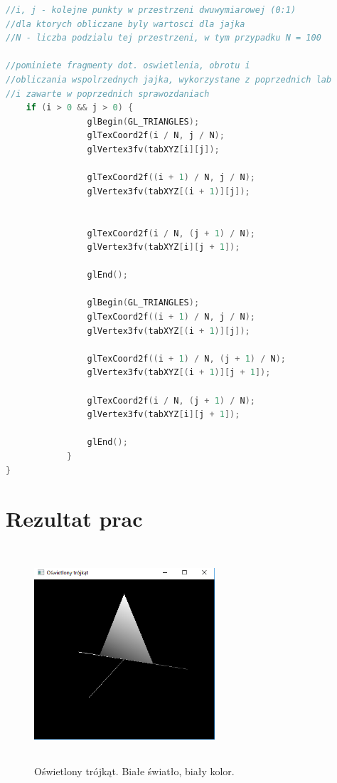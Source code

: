 \documentclass[polish,polish,a4paper]{article}
\begin{document}
{\small
\begin{lstlisting}[language=C++]
//i, j - kolejne punkty w przestrzeni dwuwymiarowej (0:1) 
//dla ktorych obliczane byly wartosci dla jajka
//N - liczba podzialu tej przestrzeni, w tym przypadku N = 100

//pominiete fragmenty dot. oswietlenia, obrotu i 
//obliczania wspolrzednych jajka, wykorzystane z poprzednich lab
//i zawarte w poprzednich sprawozdaniach
	if (i > 0 && j > 0) {
				glBegin(GL_TRIANGLES);
				glTexCoord2f(i / N, j / N);
				glVertex3fv(tabXYZ[i][j]);

				glTexCoord2f((i + 1) / N, j / N);
				glVertex3fv(tabXYZ[(i + 1)][j]);


				glTexCoord2f(i / N, (j + 1) / N);
				glVertex3fv(tabXYZ[i][j + 1]);

				glEnd();

				glBegin(GL_TRIANGLES);
				glTexCoord2f((i + 1) / N, j / N);
				glVertex3fv(tabXYZ[(i + 1)][j]);

				glTexCoord2f((i + 1) / N, (j + 1) / N);
				glVertex3fv(tabXYZ[(i + 1)][j + 1]);

				glTexCoord2f(i / N, (j + 1) / N);
				glVertex3fv(tabXYZ[i][j + 1]);

				glEnd();
			}
}
\end{lstlisting}
}


  \section{Rezultat prac}

    \begin{figure}[h!]
      \centering
      \includegraphics[width=0.6\textwidth,height=8cm]{oswietlonytrojkat.png}
      \caption{Oświetlony trójkąt. Białe światło, biały kolor.}
      \label{fig:zrzut1}
    \end{figure}
\end{document}
